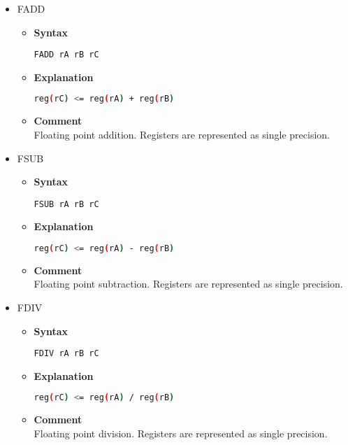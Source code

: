 \begin{itemize}
    \item FADD
    \begin{itemize}
        \item \textbf{Syntax}
        \begin{lstlisting}[language={[markII]Assembler}, frame=single]
    FADD rA rB rC
        \end{lstlisting}
        \item \textbf{Explanation}
        \begin{lstlisting}[language=bash, frame=single]
    reg(rC) <= reg(rA) + reg(rB)
        \end{lstlisting}
        \item \textbf{Comment} \\
        Floating point addition. Registers are represented as single precision.
    \end{itemize}

    \item FSUB
    \begin{itemize}
        \item \textbf{Syntax}
        \begin{lstlisting}[language={[markII]Assembler}, frame=single]
    FSUB rA rB rC
        \end{lstlisting}
        \item \textbf{Explanation}
        \begin{lstlisting}[language=bash, frame=single]
    reg(rC) <= reg(rA) - reg(rB)
        \end{lstlisting}
        \item \textbf{Comment} \\
        Floating point subtraction. Registers are represented as single precision.
    \end{itemize}

    \item FDIV
    \begin{itemize}
        \item \textbf{Syntax}
        \begin{lstlisting}[language={[markII]Assembler}, frame=single]
    FDIV rA rB rC
        \end{lstlisting}
        \item \textbf{Explanation}
        \begin{lstlisting}[language=bash, frame=single]
    reg(rC) <= reg(rA) / reg(rB)
        \end{lstlisting}
        \item \textbf{Comment} \\
        Floating point division. Registers are represented as single precision.
    \end{itemize}


\end{itemize}
